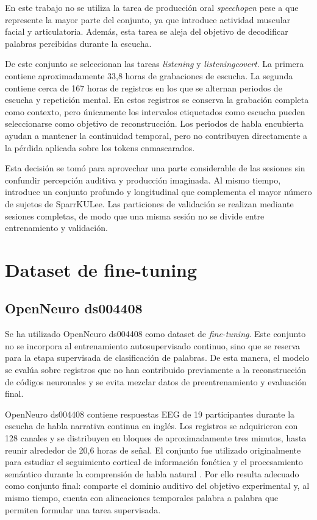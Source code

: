 En este trabajo no se utiliza la tarea de producción oral \textit{speechopen} pese a que represente la mayor parte del conjunto, ya que introduce actividad muscular facial y articulatoria. Además, esta tarea se aleja del objetivo de decodificar palabras percibidas durante la escucha.

De este conjunto se seleccionan las tareas \textit{listening} y \textit{listeningcovert}. La primera contiene aproximadamente 33,8 horas de grabaciones de escucha. La segunda contiene cerca de 167 horas de registros en los que se alternan periodos de escucha y repetición mental. En estos registros se conserva la grabación completa como contexto, pero únicamente los intervalos etiquetados como escucha pueden seleccionarse como objetivo de reconstrucción. Los periodos de habla encubierta ayudan a mantener la continuidad temporal, pero no contribuyen directamente a la pérdida aplicada sobre los tokens enmascarados.

Esta decisión se tomó para aprovechar una parte considerable de las sesiones sin confundir percepción auditiva y producción imaginada. Al mismo tiempo, introduce un conjunto profundo y longitudinal que complementa el mayor número de sujetos de SparrKULee. Las particiones de validación se realizan mediante sesiones completas, de modo que una misma sesión no se divide entre entrenamiento y validación.

\section{Dataset de fine-tuning}

\subsection{OpenNeuro ds004408}

Se ha utilizado OpenNeuro ds004408 como dataset de \textit{fine-tuning}. Este conjunto no se incorpora al entrenamiento autosupervisado continuo, sino que se reserva para la etapa supervisada de clasificación de palabras. De esta manera, el modelo se evalúa sobre registros que no han contribuido previamente a la reconstrucción de códigos neuronales y se evita mezclar datos de preentrenamiento y evaluación final.

OpenNeuro ds004408 contiene respuestas EEG de 19 participantes durante la escucha de habla narrativa continua en inglés. Los registros se adquirieron con 128 canales y se distribuyen en bloques de aproximadamente tres minutos, hasta reunir alrededor de 20,6 horas de señal. El conjunto fue utilizado originalmente para estudiar el seguimiento cortical de información fonética y el procesamiento semántico durante la comprensión de habla natural \cite{diliberto2015phoneme,broderick2018semantic}. Por ello resulta adecuado como conjunto final: comparte el dominio auditivo del objetivo experimental y, al mismo tiempo, cuenta con alineaciones temporales palabra a palabra que permiten formular una tarea supervisada.

